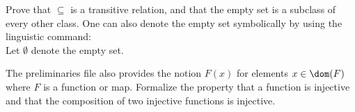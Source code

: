 \documentclass{stex}
\begin{document}
\begin{exercise}
Prove that $\subseteq$ is a transitive relation, and that
the empty set is a subclass of every other class.
One can also denote the empty set symbolically by
using the linguistic command:\\
Let $\emptyset$ denote the empty set.
\end{exercise}

\begin{exercise}
The preliminaries file also provides the notion $F(x)$ for elements $x \in \dom(F)$
where $F$ is a function or map.
Formalize the property that a function is injective and that
the composition of two injective functions is injective.
\end{exercise}
\end{document}

